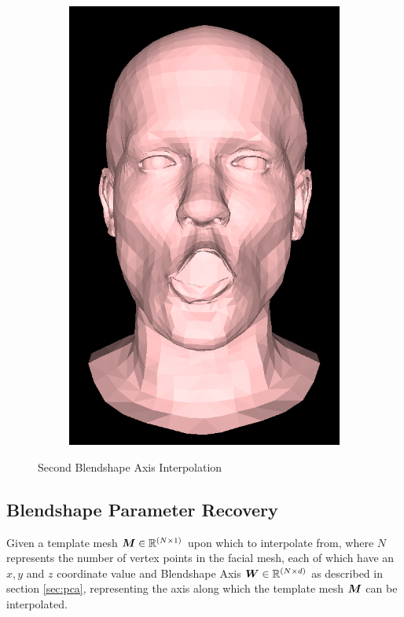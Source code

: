 \begin{figure}[h]
\begin{subfigure}[b]{0.24\textwidth}
        \includegraphics[width=\textwidth]{figures/blendshape_interp/2/00004.png}
    \end{subfigure}
    \caption{Second Blendshape Axis Interpolation}\label{fig:Blendshape_axis_2}
\end{figure}

\subsection{Blendshape Parameter Recovery}
Given a template mesh ${\boldsymbol{{M}}} \in \mathbb{R}^{(N \times 1)}$ upon which to interpolate from, where $N$ represents the number of vertex points in the facial mesh, each of which have an $x, y$ and $z$ coordinate value and Blendshape Axis ${\boldsymbol{{W}}} \in \mathbb{R}^{(N \times d)}$ as described in section \ref{sec:pca}, representing the axis along which the template mesh ${\boldsymbol{{M}}}$ can be interpolated.

